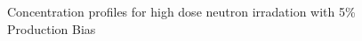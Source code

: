 \documentclass[a4paper]{article}
\begin{document}
      \begin{figure}[h!]  %
        \centering
        \qquad
        \caption{Concentration profiles for high dose neutron irradation with 5\% Production Bias}
        \label{figure:concentrations_neutron_5_1e-3}
      \end{figure}
\end{document}
